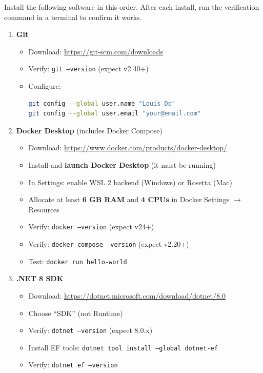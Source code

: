 \documentclass[12pt,letterpaper]{article}
\begin{document}
Install the following software in this order. After each install, run the verification command in a terminal to confirm it works.

\begin{enumerate}

  \item \textbf{Git}
  \begin{itemize}
    \item Download: \url{https://git-scm.com/downloads}
    \item Verify: \texttt{git --version} (expect v2.40+)
    \item Configure:
    \begin{lstlisting}[style=code,language=bash]
git config --global user.name "Louis Do"
git config --global user.email "your@email.com"
    \end{lstlisting}
  \end{itemize}

  \item \textbf{Docker Desktop} (includes Docker Compose)
  \begin{itemize}
    \item Download: \url{https://www.docker.com/products/docker-desktop/}
    \item Install and \textbf{launch Docker Desktop} (it must be running)
    \item In Settings: enable WSL 2 backend (Windows) or Rosetta (Mac)
    \item Allocate at least \textbf{6 GB RAM} and \textbf{4 CPUs} in Docker Settings $\rightarrow$ Resources
    \item Verify: \texttt{docker --version} (expect v24+)
    \item Verify: \texttt{docker-compose --version} (expect v2.20+)
    \item Test: \texttt{docker run hello-world}
  \end{itemize}

  \item \textbf{.NET 8 SDK}
  \begin{itemize}
    \item Download: \url{https://dotnet.microsoft.com/download/dotnet/8.0}
    \item Choose ``SDK'' (not Runtime)
    \item Verify: \texttt{dotnet --version} (expect 8.0.x)
    \item Install EF tools: \texttt{dotnet tool install --global dotnet-ef}
    \item Verify: \texttt{dotnet ef --version}
  \end{itemize}


\end{enumerate}
\end{document}
